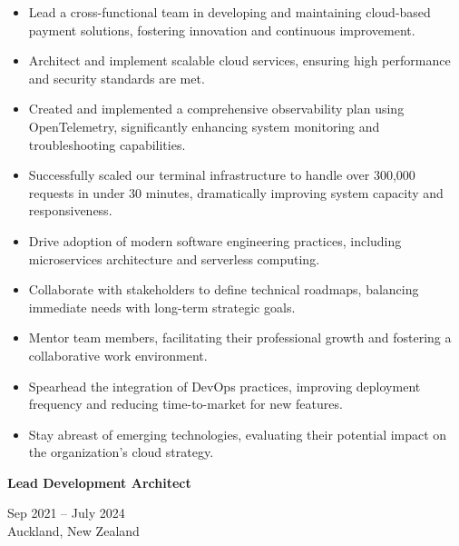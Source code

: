 \documentclass[10pt,a4paper,ragged2e,withhyper]{altacv}
\renewcommand{\cvevent}[4]{%
  \textbf{#1} %
  \hfill %
  \begin{minipage}[t]{.5\linewidth}
    \raggedleft %
    \small#3 %
    \\ %
    #4 %
  \end{minipage}
  \vspace{\baselineskip} %
}
\begin{document}
\begin{itemize}
\item Lead a cross-functional team in developing and maintaining cloud-based payment solutions, fostering innovation and continuous improvement.
\item Architect and implement scalable cloud services, ensuring high performance and security standards are met.
\item Created and implemented a comprehensive observability plan using OpenTelemetry, significantly enhancing system monitoring and troubleshooting capabilities.
\item Successfully scaled our terminal infrastructure to handle over 300,000 requests in under 30 minutes, dramatically improving system capacity and responsiveness.
\item Drive adoption of modern software engineering practices, including microservices architecture and serverless computing.
\item Collaborate with stakeholders to define technical roadmaps, balancing immediate needs with long-term strategic goals.
\item Mentor team members, facilitating their professional growth and fostering a collaborative work environment.
\item Spearhead the integration of DevOps practices, improving deployment frequency and reducing time-to-market for new features.
\item Stay abreast of emerging technologies, evaluating their potential impact on the organization's cloud strategy.
\end{itemize}

\vspace{0.5cm}

\cvevent{Lead Development Architect}{Idexx Laboratories}{Sep 2021 -- July 2024}{Auckland, New Zealand}
\end{document}
